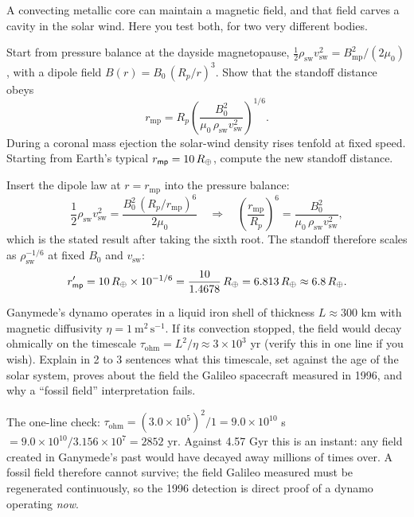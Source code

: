 
A convecting metallic core can maintain a magnetic field, and that field carves a cavity in
the solar wind. Here you test both, for two very different bodies.

\parti Start from pressure balance at the dayside magnetopause,
$\tfrac{1}{2}\rho_\mathrm{sw} v_\mathrm{sw}^2 = B_\mathrm{mp}^2/(2\mu_0)$, with a dipole
field $B(r) = B_0\,(R_p/r)^3$. Show that the standoff distance obeys
\[
  r_\mathrm{mp} = R_p \left(\frac{B_0^{2}}{\mu_0\,\rho_\mathrm{sw} v_\mathrm{sw}^{2}}\right)^{1/6}.
\]
During a coronal mass ejection the solar-wind density rises tenfold at fixed speed.
Starting from Earth's typical $r_\mathsf{mp} = 10\,R_{\oplus}$, compute the new standoff
distance.

\begin{solution}
Insert the dipole law at $r = r_\mathrm{mp}$ into the pressure balance:
\[
  \frac{1}{2}\rho_\mathrm{sw} v_\mathrm{sw}^2 = \frac{B_0^2\,(R_p/r_\mathrm{mp})^6}{2\mu_0}
  \quad\Rightarrow\quad
  \left(\frac{r_\mathrm{mp}}{R_p}\right)^{6} = \frac{B_0^{2}}{\mu_0\,\rho_\mathrm{sw} v_\mathrm{sw}^{2}},
\]
which is the stated result after taking the sixth root. The standoff therefore scales as
$\rho_\mathrm{sw}^{-1/6}$ at fixed $B_0$ and $v_\mathrm{sw}$:
\[
  r_\mathsf{mp}' = 10\,R_{\oplus} \times 10^{-1/6} = \frac{10}{1.4678}\,R_{\oplus} = 6.813\,R_{\oplus} \approx 6.8\,R_{\oplus}.
\]
\end{solution}

\parti Ganymede's dynamo operates in a liquid iron shell of thickness $L \approx 300$ km
with magnetic diffusivity $\eta = 1\ \mathrm{m^2\,s^{-1}}$. If its convection stopped, the
field would decay ohmically on the timescale
$\tau_\mathrm{ohm} = L^2/\eta \approx 3 \times 10^{3}$ yr (verify this in one line if you
wish). Explain in 2 to 3 sentences what this timescale, set against the age of the solar
system, proves about the field the Galileo spacecraft measured in 1996, and why a
``fossil field'' interpretation fails.

\begin{solution}
The one-line check: $\tau_\mathrm{ohm} = (3.0 \times 10^{5})^2 / 1 = 9.0 \times 10^{10}$ s
$= 9.0 \times 10^{10} / 3.156 \times 10^{7} = 2852$ yr.
Against 4.57 Gyr this is an instant: any field created in Ganymede's past would have
decayed away millions of times over. A fossil field therefore cannot survive; the field
Galileo measured must be regenerated continuously, so the 1996 detection is direct proof of
a dynamo operating \emph{now}.
\end{solution}

